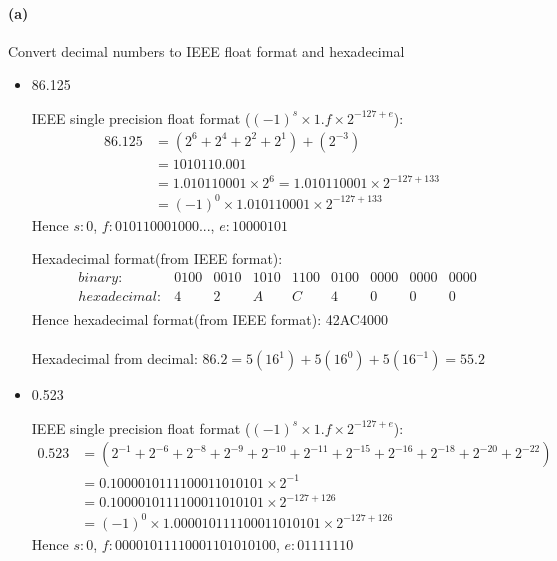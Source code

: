 \documentclass{article}
\begin{document}
\paragraph{(a)} Convert decimal numbers to IEEE float format and hexadecimal
\newline\newline
\begin{itemize}
\item 86.125 \newline
  
  IEEE single precision float format ($(-1)^s \times 1.f \times 2^{-127 + e}$):
  \begin{align*}
    86.125 &= (2^{6} + 2^{4} + 2^{2} + 2^{1}) + (2^{-3})\\
           &= 1010110.001\\
           &= 1.010110001 \times 2^6 = 1.010110001 \times 2^{-127 + 133}\\
           &= (-1)^0 \times 1.010110001 \times 2^{-127 + 133}
  \end{align*}
  Hence $s:0$, $f:010110001000...$, $e:10000101$\newline

  Hexadecimal format(from IEEE format):
  \begin{align*}
    &binary: & 0100 & 0010 & 1010 & 1100 & 0100 & 0000 & 0000 & 0000\\
    &hexadecimal: & 4 & 2  & A    & C    & 4    & 0    & 0    & 0   \\
  \end{align*}
  Hence hexadecimal format(from IEEE format): 42AC4000
  \\\\
  Hexadecimal from decimal: $86.2 = 5(16^1) + 5(16^0) + 5(16^{-1}) = 55.2$
\newline\newline

\item 0.523 \newline
  
  IEEE single precision float format ($(-1)^s \times 1.f \times 2^{-127 + e}$):
  \begin{align*}
    0.523 &= (2^{-1} + 2^{-6} + 2^{-8} + 2^{-9} + 2^{-10} + 2^{-11}
            + 2^{-15} + 2^{-16} + 2^{-18} + 2^{-20} + 2^{-22})\\
          &= 0.1000010111100011010101 \times 2^{-1}\\
          &= 0.1000010111100011010101 \times 2^{-127 + 126}\\
          &= (-1)^0 \times 1.000010111100011010101 \times 2^{-127 + 126}
  \end{align*}
  Hence $s:0$, $f:00001011110001101010100$, $e:01111110$\newline


\end{itemize}
\end{document}
